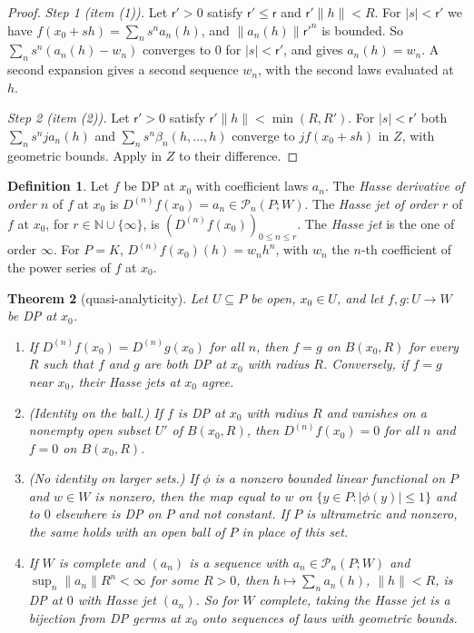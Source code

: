 \documentclass[11pt]{amsart}
\newtheorem{theorem}{Theorem}[section]
\theoremstyle{definition}
\newtheorem{definition}[theorem]{Definition}
\theoremstyle{remark}
\numberwithin{equation}{section}
\newcommand{\N}{\mathbb N}
\newcommand{\abs}[1]{\lvert #1\rvert}
\newcommand{\norm}[1]{\lVert #1\rVert}
\theoremstyle{plain}
\theoremstyle{definition}
\theoremstyle{plain}
\newcommand{\cP}{\mathcal P}
\begin{document}
\begin{proof}
\emph{Step 1 (item (1)).} Let $\mathsf r'>0$ satisfy $\mathsf r'\le\mathsf r$ and $\mathsf r'\norm h<R$. For $\abs s<\mathsf r'$ we have $f(x_0+sh)=\sum_ns^na_n(h)$, and $\norm{a_n(h)}\mathsf r'^n$ is bounded. So $\sum_ns^n(a_n(h)-w_n)$ converges to $0$ for $\abs s<\mathsf r'$, and \cite[Lemma~A.1]{I} gives $a_n(h)=w_n$. A second expansion gives a second sequence $w_n$, with the second laws evaluated at $h$.

\emph{Step 2 (item (2)).} Let $\mathsf r'>0$ satisfy $\mathsf r'\norm h<\min(R,R')$. For $\abs s<\mathsf r'$ both $\sum_ns^nja_n(h)$ and $\sum_ns^n\beta_n(h,\dots,h)$ converge to $jf(x_0+sh)$ in $Z$, with geometric bounds. Apply \cite[Lemma~A.1]{I} in $Z$ to their difference.
\end{proof}

\begin{definition}\label{dp:def:hasse}
Let $f$ be DP at $x_0$ with coefficient laws $a_n$. The \emph{Hasse derivative of order $n$} of $f$ at $x_0$ is $D^{(n)}f(x_0)=a_n\in\cP_n(P;W)$. The \emph{Hasse jet of order $r$} of $f$ at $x_0$, for $r\in\N\cup\{\infty\}$, is $(D^{(n)}f(x_0))_{0\le n\le r}$. The \emph{Hasse jet} is the one of order $\infty$. For $P=K$, $D^{(n)}f(x_0)(h)=w_nh^n$, with $w_n$ the $n$-th coefficient of the power series of $f$ at $x_0$.
\end{definition}

\begin{theorem}[quasi-analyticity]\label{dp:thm:quasi-analytic}
Let $U\subseteq P$ be open, $x_0\in U$, and let $f,g\colon U\to W$ be DP at $x_0$.
\begin{enumerate}
\item If $D^{(n)}f(x_0)=D^{(n)}g(x_0)$ for all $n$, then $f=g$ on $B(x_0,R)$ for every $R$ such that $f$ and $g$ are both DP at $x_0$ with radius $R$. Conversely, if $f=g$ near $x_0$, their Hasse jets at $x_0$ agree.
\item \textup{(Identity on the ball.)} If $f$ is DP at $x_0$ with radius $R$ and vanishes on a nonempty open subset $U'$ of $B(x_0,R)$, then $D^{(n)}f(x_0)=0$ for all $n$ and $f=0$ on $B(x_0,R)$.
\item \textup{(No identity on larger sets.)} If $\phi$ is a nonzero bounded linear functional on $P$ and $w\in W$ is nonzero, then the map equal to $w$ on $\{y\in P:\abs{\phi(y)}\le1\}$ and to $0$ elsewhere is DP on $P$ and not constant. If $P$ is ultrametric and nonzero, the same holds with an open ball of $P$ in place of this set.
\item If $W$ is complete and $(a_n)$ is a sequence with $a_n\in\cP_n(P;W)$ and $\sup_n\norm{a_n}R^n<\infty$ for some $R>0$, then $h\mapsto\sum_na_n(h)$, $\norm h<R$, is DP at $0$ with Hasse jet $(a_n)$. So for $W$ complete, taking the Hasse jet is a bijection from DP germs at $x_0$ onto sequences of laws with geometric bounds.
\end{enumerate}
\end{theorem}
\end{document}
